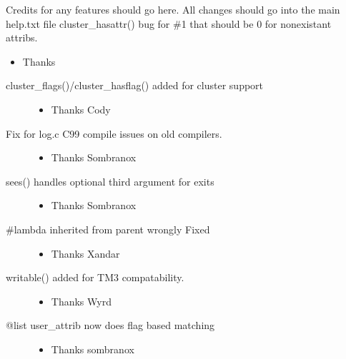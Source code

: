 \documentclass[letterpaper,10pt,english]{sphinxmanual}
\begin{document}
\sphinxAtStartPar
Credits for any features should go here.  All changes should go into the main help.txt file
cluster\_hasattr() bug for \#\sphinxhyphen{}1 that should be 0 for non\sphinxhyphen{}existant attribs.
\begin{itemize}
\item {} 
\sphinxAtStartPar
Thanks 

\end{itemize}
\begin{description}
\item[{cluster\_flags()/cluster\_hasflag() added for cluster support}] \leavevmode\begin{itemize}
\item {} 
\sphinxAtStartPar
Thanks Cody

\end{itemize}

\item[{Fix for log.c C99 compile issues on old compilers.}] \leavevmode\begin{itemize}
\item {} 
\sphinxAtStartPar
Thanks Sombranox

\end{itemize}

\item[{sees() handles optional third argument for exits}] \leavevmode\begin{itemize}
\item {} 
\sphinxAtStartPar
Thanks Sombranox

\end{itemize}

\item[{\#lambda inherited from parent wrongly \sphinxhyphen{} Fixed}] \leavevmode\begin{itemize}
\item {} 
\sphinxAtStartPar
Thanks Xandar

\end{itemize}

\item[{writable() added for TM3 compatability.}] \leavevmode\begin{itemize}
\item {} 
\sphinxAtStartPar
Thanks Wyrd

\end{itemize}

\item[{@list user\_attrib now does flag based matching}] \leavevmode\begin{itemize}
\item {} 
\sphinxAtStartPar
Thanks sombranox


\end{itemize}
\end{description}
\end{document}
